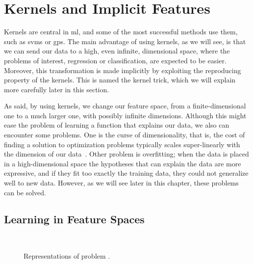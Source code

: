 \section{Kernels and Implicit Features}\label{sec:ch2_kernels}
Kernels are central in \acrfull{ml}, and some of the most successful methods use them, such as \acrshort{svms} or \acrfull{gps}.
The main advantage of using kernels, as we will see, is that we can send our data to a high, even infinite, dimensional space, where the problems of interest, regression or classification, are expected to be easier. Moreover, this transformation is made implicitly by exploiting the reproducing property of the kernels. This is named the kernel trick, which we will explain more carefully later in this section.

As said, by using kernels, we change our feature space, from a finite-dimensional one to a much larger one, with possibly infinite dimensions. Although this might ease the problem of learning a function that explains our data, we also can encounter some problems. One is the curse of dimensionality, that is, the cost of finding a solution to optimization problems typically scales super-linearly with the dimension of our data~\citep{Chapelle07}. Other problem is overfitting; when the data is placed in a high-dimensional space the hypotheses that can explain the data are more expressive, and if they fit too exactly the training data, they could not generalize well to new data. However, as we will see later in this chapter, these problems can be solved.


\subsection{Learning in Feature Spaces} %

\begin{figure}[t!]
    \centering
    \quad%
    \\
    \caption{Representations of problem .}
    \label{fig:iris}
\end{figure}



